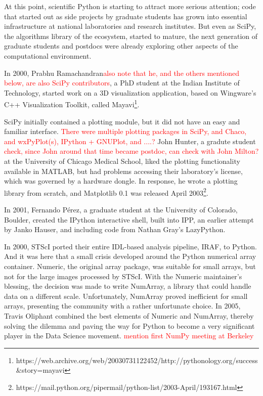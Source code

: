\documentclass[fleqn,10pt]{wlscirep}
\newcommand{\fixme}[1]{\textcolor{red}{{#1}}}
\begin{document}

At this point, scientific Python is starting to attract more serious
attention; code that started out as side projects by graduate students
has grown into essential infrastructure at national laboratories and
research institutes.  But even as SciPy, the algorithms library of the
ecosystem, started to mature, the next generation of graduate students
and postdocs were already exploring other aspects of the computational
environment.

In 2000, Prabhu Ramachandran\fixme{also note that he, and the others
  mentioned below, are also SciPy contributors}, a PhD student at the Indian Institute of
Technology, started work on a 3D visualization application, based on
Wingware's C++ Visualization Toolkit, called
Mayavi\footnote{https://web.archive.org/web/20030731122452/http://pythonology.org/success\&story=mayavi}.

SciPy initially contained a plotting module, but it did not have an
easy and familiar interface. \fixme{There were multiple plotting
  packages in SciPy, and Chaco, and wxPyPlot(s), IPython + GNUPlot,
  and ....?}
John Hunter, a gradute student
\fixme{check, since John around that time became postdoc, can check
  with John Milton?} at the University
of Chicago Medical School, liked the plotting functionality
available in MATLAB, but had problems accessing their laboratory's
license, which was governed by a hardware dongle.  In response, he
wrote a plotting library from scratch, and Matplotlib 0.1 was released
April 2003\footnote{https://mail.python.org/pipermail/python-list/2003-April/193167.html}.

In 2001, Fernando Pérez, a graduate student at the University of
Colorado, Boulder, created the IPython interactive shell, built into
IPP, an earlier attempt by Janko Hauser, and including code from
Nathan Gray's LazyPython.

In 2000, STScI ported their entire IDL-based analysis pipeline, IRAF,
to Python.  And it was here that a small crisis developed around the
Python numerical array container.  Numeric, the original array package, was
suitable for small arrays, but not for the large images processed by
STScI.  With the Numeric maintainer's blessing, the decision was made
to write NumArray, a library that could handle data on a different
scale.  Unfortunately, NumArray proved inefficient for small arrays,
presenting the community with a rather unfortunate choice.  In 2005,
Travis Oliphant combined the best elements of Numeric and NumArray,
thereby solving the dilemma and paving the way for Python to become
a very significant player in the Data Science movement. \fixme{mention
  first NumPy meeting at Berkeley}
\end{document}

